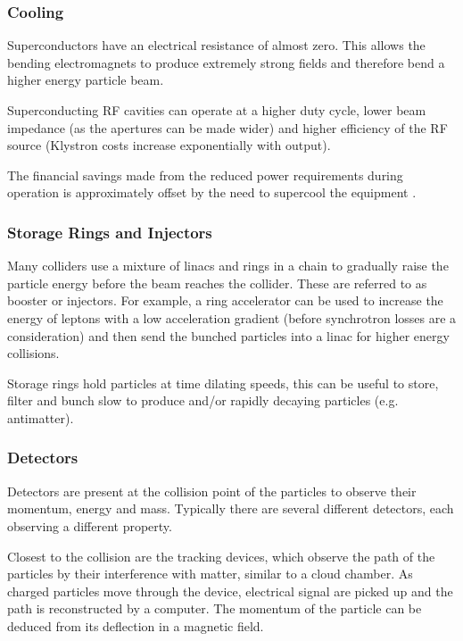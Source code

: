  \subsubsection{Cooling}
 
 Superconductors have an electrical resistance of almost zero. This allows the bending electromagnets to produce extremely strong fields and therefore bend a higher energy particle beam.
 
 Superconducting RF cavities can operate at a higher duty cycle, lower beam impedance (as the apertures can be made wider) and higher efficiency of the RF source (Klystron costs increase exponentially with output). 
 
 The financial savings made from the reduced power requirements during operation is approximately offset by the need to supercool the equipment \cite{ILC:TechnicalDesignReport}.
 
 \subsubsection{Storage Rings and Injectors}
 
Many colliders use a mixture of linacs and rings in a chain to gradually raise the particle energy before the beam reaches the collider. These are referred to as booster or injectors. For example, a ring accelerator can be used to increase the energy of leptons with a low acceleration gradient (before synchrotron losses are a consideration) and then send the bunched particles into a linac for higher energy collisions.

Storage rings hold particles at time dilating speeds, this can be useful to store, filter and bunch slow to produce and/or rapidly decaying particles (e.g. antimatter).

 \subsubsection{Detectors}
  
 Detectors are present at the collision point of the particles to observe their momentum, energy and mass. Typically there are several different detectors, each observing a different property. 
 
 Closest to the collision are the tracking devices, which observe the path of the particles by their interference with matter, similar to a cloud chamber. As charged particles move through the device, electrical signal are picked up and the path is reconstructed by a computer. The momentum of the particle can be deduced from its deflection in a magnetic field.
 
